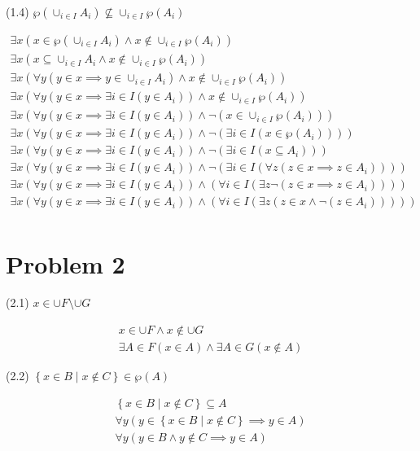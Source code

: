 \documentclass{article}
\begin{document}
\begin{center}
(1.4) $\wp(\cup_{i \in I} A_i) \nsubseteq \cup_{i \in I} \wp(A_i)$
\end{center}
\begin{align*}
\exists x(x \in \wp(\cup_{i \in I} A_i) \land x \notin \cup_{i \in I} \wp(A_i)) \\
\exists x(x \subseteq \cup_{i \in I} A_i \land x \notin \cup_{i \in I} \wp(A_i)) \\
\exists x( \forall y (y \in x \implies y \in \cup_{i \in I} A_i) \land
x \notin \cup_{i \in I} \wp(A_i)) \\
\exists x( \forall y (y \in x \implies \exists i \in I(y \in A_i))
\land x \notin \cup_{i \in I} \wp(A_i)) \\
\exists x( \forall y (y \in x \implies \exists i \in I(y \in A_i))
\land \neg (x \in \cup_{i \in I} \wp(A_i))) \\
\exists x( \forall y (y \in x \implies \exists i \in I(y \in A_i))
\land \neg (\exists i \in I(x \in \wp(A_i)))) \\
\exists x( \forall y (y \in x \implies \exists i \in I(y \in A_i))
\land \neg (\exists i \in I(x \subseteq A_i))) \\
\exists x( \forall y (y \in x \implies \exists i \in I(y \in A_i))
\land \neg (\exists i \in I(\forall z (z \in x \implies z \in A_i)))) \\
\exists x( \forall y (y \in x \implies \exists i \in I(y \in A_i))
\land (\forall i \in I(\exists z \neg(z \in x \implies z \in A_i)))) \\
\exists x( \forall y (y \in x \implies \exists i \in I(y \in A_i))
\land (\forall i \in I(\exists z (z \in x \land \neg(z \in A_i))))) \\
\end{align*}

\section{Problem 2}
\begin{center}
(2.1) $x \in \cup F \setminus \cup G $
\end{center}
\begin{align*}
x \in \cup F \land x \notin \cup G \\
\exists A \in F(x \in A) \land \exists A \in G(x \notin A)
\end{align*}

\begin{center}
(2.2) $\left\{ x \in B \mid x \notin C\right\} \in \wp(A)$ 
\end{center}
\begin{align*}
\left\{ x \in B \mid x \notin C\right\} \subseteq A  \\
\forall y(y \in \left\{ x \in B \mid x \notin C\right\} \implies y \in A) \\
\forall y(y \in  B \land y \notin C \implies y \in A) \\
\end{align*}
\end{document}

